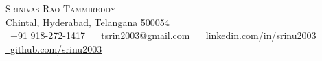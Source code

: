 \documentclass[a4paper,11pt]{article}
\begin{document}

\begin{center}

    {\Huge \scshape Srinivas Rao Tammireddy} \\ \vspace{6pt}
    Chintal, Hyderabad, Telangana 500054 \\ \vspace{1pt}
    \small \raisebox{-0.1\height}
    \faPhone\ +91 918-272-1417 ~
    \href{mailto:tsrin2003@gmail.com}{\raisebox{-0.2\height}\faEnvelope\  {tsrin2003@gmail.com}} ~
    \href{https://linkedin.com/in/srinu2003/}{\raisebox{-0.2\height}\faLinkedin\ {linkedin.com/in/srinu2003}}  ~
    \href{https://github.com/srinu2003}{\raisebox{-0.2\height}\faGithub\ {github.com/srinu2003}}
    \vspace{-8pt}
  \end{center}

\end{document}
